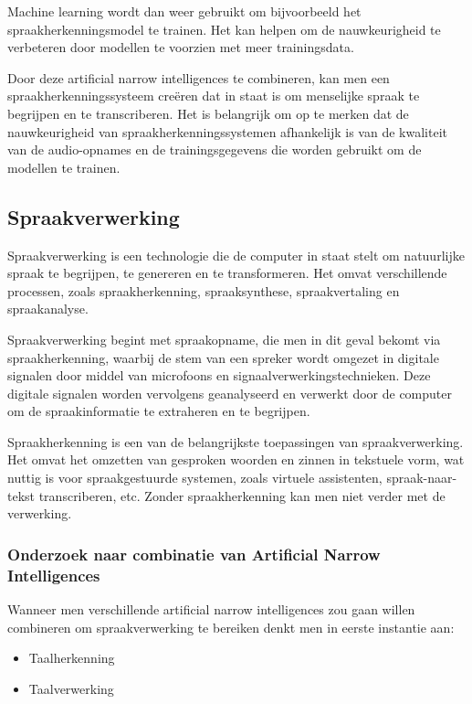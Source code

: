 Machine learning wordt dan weer gebruikt om bijvoorbeeld het spraakherkenningsmodel te trainen. Het kan helpen om de nauwkeurigheid te verbeteren door modellen te voorzien met meer trainingsdata.

Door deze artificial narrow intelligences te combineren, kan men een spraakherkenningssysteem creëren dat in staat is om menselijke spraak te begrijpen en te transcriberen. Het is belangrijk om op te merken dat de nauwkeurigheid van spraakherkenningssystemen afhankelijk is van de kwaliteit van de audio-opnames en de trainingsgegevens die worden gebruikt om de modellen te trainen.

\subsection{Spraakverwerking}

Spraakverwerking is een technologie die de computer in staat stelt om natuurlijke spraak te begrijpen, te genereren en te transformeren. Het omvat verschillende processen, zoals spraakherkenning, spraaksynthese, spraakvertaling en spraakanalyse.

Spraakverwerking begint met spraakopname, die men in dit geval bekomt via spraakherkenning, waarbij de stem van een spreker wordt omgezet in digitale signalen door middel van microfoons en signaalverwerkingstechnieken. Deze digitale signalen worden vervolgens geanalyseerd en verwerkt door de computer om de spraakinformatie te extraheren en te begrijpen.

Spraakherkenning is een van de belangrijkste toepassingen van spraakverwerking. Het omvat het omzetten van gesproken woorden en zinnen in tekstuele vorm, wat nuttig is voor spraakgestuurde systemen, zoals virtuele assistenten, spraak-naar-tekst transcriberen, etc. Zonder spraakherkenning kan men niet verder met de verwerking.

\subsubsection{Onderzoek naar combinatie van Artificial Narrow Intelligences}

Wanneer men verschillende artificial narrow intelligences zou gaan willen combineren om spraakverwerking te bereiken denkt men in eerste instantie aan:

\begin{itemize}
    \item Taalherkenning
    \item Taalverwerking
\end{itemize}

